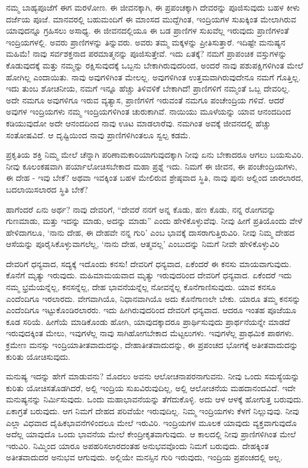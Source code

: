 ನಮ್ಮ ಬಾಹ್ಯಪೂಜೆಗೆ ಈಗ ಮರಳೋಣ. ಈ ಜೀವನಕ್ಕಾಗಿ, ಈ ಪ್ರಪಂಚಕ್ಕಾಗಿ ದೇವರನ್ನು ಪೂಜಿಸುವುದು ಬಹಳ ಕೀಳು ದರ್ಜೆಯ ಪೂಜೆ. ಮಾನವರಲ್ಲಿ ಬಹುಮಂದಿಗೆ ಈ ಮಾಂಸದ ಮುದ್ದೆಗಿಂತ, ಇಂದ್ರಿಯಗಳ ಸುಖಕ್ಕಿಂತ ಮೇಲಾಗಿರುವ ಯಾವುದನ್ನೂ ಗ್ರಹಿಸಲು ಅಸಾಧ್ಯ. ಈ ಜೀವನದಲ್ಲಿಯೂ ಈ ಬಡ ಪ್ರಾಣಿಗಳ ಸುಖವೆಲ್ಲ ಇರುವುದು ಪ್ರಾಣಿಗಳಂತೆ ಇಂದ್ರಿಯಗಳಲ್ಲಿ. ಅವರು ಪ್ರಾಣಿಗಳನ್ನು ತಿನ್ನುವರು. ಅವರು ತಮ್ಮ ಮಕ್ಕಳನ್ನು ಪ್ರೀತಿಸುತ್ತಾರೆ. ಇದಿಷ್ಟೇ ಮನುಷ್ಯನ ಮಹಿಮೆ! ನಾವು ಸರ್ವಶಕ್ತನಾದ ಪರಮಾತ್ಮನನ್ನು ಪೂಜಿಸುತ್ತೇವೆ. ಇದು ಏತಕ್ಕೆ? ನಮಗೆ ಪ್ರಾಪಂಚಿಕ ವಸ್ತುಗಳನ್ನು ಕೊಡುವುದಕ್ಕೆ ಮತ್ತು ನಮ್ಮನ್ನು ರಕ್ಷಿಸುವುದಕ್ಕೆ ಒಬ್ಬನು ಬೇಕಾಗಿರುವುದರಿಂದ, ಅಂದರೆ ನಾವು ಪಶುಪಕ್ಷಿಗಳಿಗಿಂತ ಮೇಲೆ ಹೋಗಿಲ್ಲ ಎಂದಾಯಿತು. ನಾವು ಅವುಗಳಿಗಿಂತ ಮೇಲಲ್ಲ. ಅವುಗಳಿಗಿಂತ ಉತ್ತಮವಾಗಿರುವುದೇನೂ ನಮಗೆ ಗೊತ್ತಿಲ್ಲ. ಇದು ತುಂಬ ಶೋಚನೀಯ, ನಮಗೆ ಇನ್ನೂ ಹೆಚ್ಚು ತಿಳಿವಳಿಕೆ ಬೇಕಾಗಿದೆ! ಪ್ರಾಣಿಗಳಿಗೆ ನಮ್ಮಂತೆ ಒಬ್ಬ ದೇವರಿಲ್ಲ. ಅದೇ ನಮಗೂ ಅವುಗಳಿಗೂ ಇರುವ ವ್ಯತ್ಯಾಸ, ಪ್ರಾಣಿಗಳಿಗೆ ಇರುವಂತೆ ನಮಗೂ ಪಂಚೇಂದ್ರಿಯ ಗಳಿವೆ. ಆದರೆ ಅವುಗಳ ಇಂದ್ರಿಯಗಳು ನಮ್ಮ ಇಂದ್ರಿಯಗಳಿಗಿಂತ ಚುರುಕಾಗಿವೆ. ನಾಯಿಯು ಮೂಳೆಯನ್ನು ಯಾವ ಆನಂದದಿಂದ ಕಡಿಯುವುದೋ ಅದೇ ಆನಂದದಿಂದ ನಾವು ಊಟ ಮಾಡಲಾರೆವು. ನಮಗಿಂತ ಅವಕ್ಕೆ ಜೀವನದಲ್ಲಿ ಹೆಚ್ಚು ಸಂತೋಷವಿದೆ. ಆ ದೃಷ್ಟಿಯಿಂದ ನಾವು ಪ್ರಾಣಿಗಳಿಗಿಂತಲೂ ಸ್ವಲ್ಪ ಕಡಮೆ.

ಪ್ರಕೃತಿಯ ಶಕ್ತಿ ನಿಮ್ಮ ಮೇಲೆ ಚೆನ್ನಾಗಿ ಪರಿಣಾಮಕಾರಿಯಾಗುವುದಕ್ಕಾಗಿ ನೀವು ಏನು ಬೇಕಾದರೂ ಆಗಲು ಬಯಸುವಿರಿ. ನೀವು ಕೂಲಂಕಷವಾಗಿ ಪರ್ಯಾಲೋಚಿಸಬೇಕಾದ ಮಹಾ ಪ್ರಶ್ನೆ ಇದು. ನಿಮಗೆ ಈ ಜೀವನ, ಈ ಪಂಚೇಂದ್ರಿಯಗಳು, ಈ ದೇಹ - ಇವು ಬೇಕೆ? ಅಥವಾ ಇವಕ್ಕಿಂತ ಬಹಳ ಮೇಲಿರುವ ಶ್ರೇಷ್ಠವಾದ ಸ್ಥಿತಿ, ನಾವು ಪುನಃ ಅಲ್ಲಿಂದ ಜಾರಲಾರದ, ಬದಲಾಯಿಸಲಾರದ ಸ್ಥಿತಿ ಬೇಕೆ?

ಹಾಗೆಂದರೆ ಏನು ಅರ್ಥ? ನಾವು ದೇವರಿಗೆ, “ದೇವರೆ ನನಗೆ ಅನ್ನ ಕೊಡು, ಹಣ ಕೊಡು, ನನ್ನ ರೋಗವನ್ನು ಗುಣಮಾಡು, ಮತ್ತು ಇದನ್ನು ಮಾಡು, ಅದನ್ನು ಮಾಡು” ಎಂದು ಹೇಳಿಕೊಳ್ಳುವೆವು. ನೀವು ಹೀಗೆ ಪ್ರತಿಯೊಂದು ವೇಳೆ ಹೇಳಿದಾಗಲೂ, `ನಾನು ದೇಹ, ಈ ದೇಹವೇ ನನ್ನ ಗುರಿ' ಎಂಬ ಭಾವಕ್ಕೆ ದಾಸರಾಗುತ್ತಿರುವಿರಿ. ನೀವು ನಿಮ್ಮ ದೇಹದ ಆಸೆಯನ್ನು ಪೂರೈಸಿಕೊಳ್ಳುವಾಗಲೆಲ್ಲ, `ನಾನು ದೇಹ, ಆತ್ಮವಲ್ಲ' ಎಂಬುದನ್ನು ನಿಮಗೆ ನೀವೇ ಹೇಳಿಕೊಳ್ಳುವಿರಿ

ದೇವರಿಗೆ ಧನ್ಯವಾದ, ಸದ್ಯಕ್ಕೆ ಇದೊಂದು ಕನಸು! ದೇವರಿಗೆ ಧನ್ಯವಾದ, ಏಕೆಂದರೆ ಈ ಕನಸು ಮಾಯವಾಗುವುದು. ಕೊನೆಗೆ ಮೃತ್ಯು ಇರುವುದು. ಮಹಿಮಾಮಯವಾದ ಮೃತ್ಯು ಇರುವುದರಿಂದ ದೇವರಿಗೆ ಧನ್ಯವಾದ. ಏಕೆಂದರೆ ಇದು ನಮ್ಮ ಭ್ರಮೆಯನ್ನೆಲ್ಲ, ಕನಸನ್ನೆಲ್ಲ, ದೇಹ ಭಾವನೆಯನ್ನೆಲ್ಲ ನೋವನ್ನೆಲ್ಲ ಕೊನೆಗಾಣಿಸುವುದು. ಯಾವ ಕನಸೂ ಎಂದೆಂದಿಗೂ ಇರಲಾರದು. ವೇಗವಾಗಿಯೊ, ನಿಧಾನವಾಗಿಯೊ ಅದು ಕೊನೆಗಾಣಲೇ ಬೇಕು. ಯಾರೂ ತಮ್ಮ ಕನಸನ್ನು ಎಂದೆಂದಿಗೂ ಇಟ್ಟುಕೊಂಡಿರಲಾರರು. ಇದು ಹೀಗಿರುವುದರಿಂದ ದೇವರಿಗೆ ಧನ್ಯವಾದ. ಆದರೂ ಇಂತಹ ಪೂಜೆಯೂ ಕೂಡ ಸರಿಯೆ. ಹೀಗೆಯೆ ಮಾಡಿಕೊಂಡು ಹೋಗಿ, ಯಾವುದಕ್ಕಾದರೂ ಪ್ರಾರ್ಥಿಸುವುದು ಪ್ರಾರ್ಥನೆಯನ್ನೇ ಮಾಡದೆ ಇರುವುದಕ್ಕಿಂತ ಮೇಲು, ಇವುಗಳೆಲ್ಲ ನಾವು ಸಾಗಿಹೋಗಬೇಕಾದ ಮೆಟ್ಟಲುಗಳು. ಇವುಗಳೆಲ್ಲ ಪ್ರಾಥಮಿಕ ಪಾಠಗಳು. ಕ್ರಮೇಣ ಮನಸ್ಸು ಇಂದ್ರಿಯಾತೀತವಾದುದನ್ನು, ದೇಹಾತೀತವಾದುದನ್ನು, ಈ ಪ್ರಪಂಚದ ಭೋಗಕ್ಕೆ ಅತೀತವಾದುದನ್ನು ಕುರಿತು ಯೋಚಿಸುವುದು.

ಮನುಷ್ಯ ಇದನ್ನು ಹೇಗೆ ಮಾಡುವನು? ಮೊದಲು ಅವನು ಆಲೋಚನಾಪರನಾಗುವನು. ನೀವು ಒಂದು ಸಮಸ್ಯೆಯನ್ನು ಕುರಿತು ಯೋಚಿಸತೊಡಗಿದರೆ, ಅಲ್ಲಿ ಇಂದ್ರಿಯ ಸುಖವಿರುವುದಿಲ್ಲ, ಅಲ್ಲಿ ಆಲೋಚನೆಯ ಮಹದಾನಂದವಿದೆ. ಇದೇ ಮನುಷ್ಯನನ್ನು ನಿರ್ಮಿಸುವುದು. ಒಂದು ಮಹಾಭಾವನೆಯನ್ನು ತೆಗೆದುಕೊಳ್ಳಿ. ಅದು ಆಳ ಆಳಕ್ಕೆ ಹೋಗುತ್ತ ಬರುವುದು. ಏಕಾಗ್ರತೆ ಬರುವುದು. ಆಗ ನಿಮಗೆ ದೇಹದ ಪರಿವೆಯೇ ಇರುವುದಿಲ್ಲ. ನಿಮ್ಮ ಇಂದ್ರಿಯಗಳು ಕೆಳಗೆ ನಿಲ್ಲುವುವು. ನೀವು ಎಲ್ಲಾ ವಿಧವಾದ ದೈಹಿಕಭಾವನೆಗಳಿಂದಲೂ ಮೇಲೆ ಇರುವಿರಿ. ಇಂದ್ರಿಯಗಳ ಮೂಲಕ ಯಾವುದು ವ್ಯಕ್ತವಾಗುವುದೊ ಅದೆಲ್ಲ ಯಾವುದೊ ಒಂದು ಭಾವನೆಯ ಮೇಲೆ ಕೇಂದ್ರೀಕೃತವಾಗುವುದು. ಆ ಕಾಲದಲ್ಲಿ ನೀವು ಪ್ರಾಣಿಗಳಿಗಿಂತ ಮೇಲೆ ಇರುವಿರಿ. ನಿಮ್ಮಿಂದ ಯಾರೂ ಅಪಹರಿಸಲಾರದಂತಹ ಅನುಭವವೊಂದು ನಿಮಗೆ ಬರುವುದು. ದೇಹಕ್ಕಿಂತ ಅತೀತವಾದುದರ ಅನುಭವ ಆಗುವುದು. ಅಲ್ಲಿಯೇ ಮನಸ್ಸಿನ ಗುರಿ ಇರುವುದು, ಇಂದ್ರಿಯ ಪ್ರಪಂಚದಲ್ಲಿ ಅಲ್ಲ.

